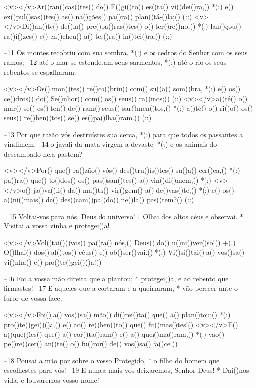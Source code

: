 <v></v>Ar()ran()cas()tes() do() E()gi()to() es()ta() vi()dei()ra,() *(:)
e() ex()pul()sas()tes() as() na()ções() pa()ra() plan()tá-()la;() (::)
<v></v>Di()an()te() de()la() pre()pa()ras()tes() o() ter()re()no,() *(:)
lan()çou() ra()í()zes() e() en()cheu() a() ter()ra() in()tei()ra.() (::)

–11 Os montes recobriu com sua sombra, *(:)
e os cedros do Senhor com os seus ramos;
–12 até o mar se estenderam seus sarmentos, *(:)
até o rio os seus rebentos se espalharam.

<v></v>Os() mon()tes() re()co()briu() com() su()a() som()bra, *(:)
e() os() ce()dros() do() Se()nhor() com() os() seus() ra()mos;() (::)
<v></v>a()té() o() mar() se() es() ten() de() ram() seus() sar()men()tos,() *(:)
a()té() o() ri()o() os() seus() re()ben()tos() se() es()pa()lha()ram.() (::)

–13 Por que razão vós destruístes sua cerca, *(:)
para que todos os passantes a vindimem,
–14 o javali da mata virgem a devaste, *(:)
e os animais do descampado nela pastem?

<v></v>Por() que() ra()zão() vós() des()tru()ís()tes() su()a() cer()ca,() *(:)
pa()ra() que() to()dos() os() pas()san()tes() a() vin()di()mem,() *(:)
<v></v>o() ja()va()li() da() ma()ta() vir()gem() a() de()vas()te,() *(:)
e() os() a()ni()mais() do() des()cam()pa()do() ne()la() pas()tem?() (::)

=15 Voltai-vos para nós, Deus do universo! †
Olhai dos altos céus e observai. *
Visitai a vossa vinha e protegei()a!

<v></v>Vol()tai()()vos() pa()ra() nós,() Deus() do() u()ni()ver()so!() +(,)
O()lhai() dos() al()tos() céus() e() ob()ser()vai.() *(:)
Vi()si()tai() a() vos()sa() vi()nha() e() pro()te()gei()()a!()

–16 Foi a vossa mão direita que a plantou; *
protegei()a, e ao rebento que firmastes!
–17 E aqueles que a cortaram e a queimaram, *
vão perecer ante o furor de vossa face.

<v></v>Foi() a() vos()sa() mão() di()rei()ta() que() a() plan()tou;() *(:)
pro()te()gei()()a,() e() ao() re()ben()to() que() fir()mas()tes!()
<v></v>E() a()que()les() que() a() cor()ta()ram() e() a() quei()ma()ram,() *(:)
vão() pe()re()cer() an()te() o() fu()ror() de() vos()sa() fa()ce.()

–18 Pousai a mão por sobre o vosso Protegido, *
o filho do homem que escolhestes para vós!
–19 E nunca mais vos deixaremos, Senhor Deus! *
Dai()nos vida, e louvaremos vosso nome!

